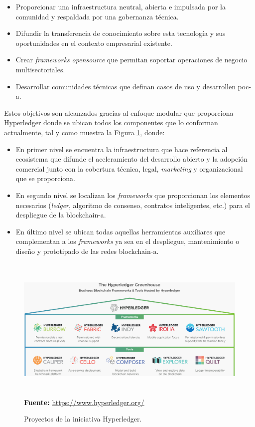 \documentclass[12pt,a4paper, twoside]{report}
\begin{document}
	\begin{itemize}
		\item Proporcionar una infraestructura neutral, abierta e impulsada por la comunidad y respaldada por una gobernanza técnica.
		\item Difundir la transferencia de conocimiento sobre esta tecnología y sus oportunidades en el contexto empresarial existente.
		\item Crear \textit{\glspl{framework}} \textit{\gls{opensource}} que permitan soportar operaciones de negocio multisectoriales.
		\item Desarrollar comunidades técnicas que definan casos de uso y desarrollen \gls{poc-a}.	
	\end{itemize}

	Estos objetivos son alcanzados gracias al enfoque modular que proporciona Hyperledger donde se ubican todos los componentes que lo conforman actualmente, tal y como muestra la Figura \ref{fig:stateArt_hyperledger}, donde:
	
	\begin{itemize}
		\item En primer nivel se encuentra la infraestructura que hace referencia al ecosistema que difunde el aceleramiento del desarrollo abierto y la adopción comercial junto con la cobertura técnica, legal, \textit{marketing} y organizacional que se proporciona.
		\item En segundo nivel se localizan los \textit{\glspl{framework}} que proporcionan los elementos necesarios (\textit{ledger}, algoritmo de consenso, contratos inteligentes, etc.) para el despliegue de la \gls{blockchain-a}.
		\item En último nivel se ubican todas aquellas herramientas 	auxiliares que complementan a los \textit{\glspl{framework}} ya sea en el despliegue, mantenimiento o diseño y prototipado de las redes \gls{blockchain-a}. 
	\end{itemize}
	
	 \begin{figure}[!ht]   
		\caption{Proyectos de la iniciativa Hyperledger.} 
		\begin{center} 
			\includegraphics[width=16cm,height=7cm]{Images/stateArt/hyperledger} \\
			\label{fig:stateArt_hyperledger} 
			\textbf{Fuente:} \url{https://www.hyperledger.org/}
		\end{center}  
	\end{figure}
	
\end{document}
